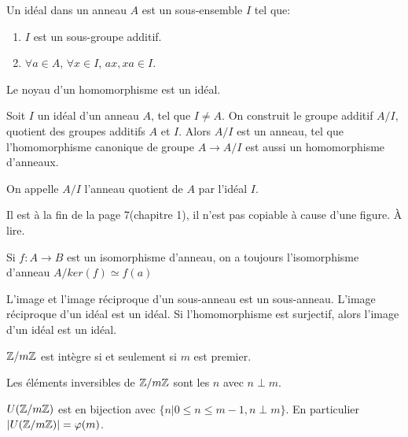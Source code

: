 \documentclass[12pt,a4paper]{article}
\begin{document}
\begin{flushleft}
\begin{mydef}
Un idéal dans un anneau $A$ est un sous-ensemble $I$ tel que:
\begin{enumerate}
\item $I$ est un sous-groupe additif.
\item $\forall a \in A$, $\forall x \in I$, $ax, xa \in I$.
\end{enumerate}
\end{mydef}

\begin{prop}
Le noyau d'un homomorphisme est un idéal.
\end{prop}

\begin{prop}
Soit $I$ un idéal d'un anneau $A$, tel que $I \neq A$. On construit le groupe additif $A/I$, quotient des groupes additifs $A$ et $I$. Alors $A/I$ est un anneau, tel que l'homomorphisme canonique de groupe $A \longrightarrow A/I$ est aussi un homomorphisme d'anneaux.
\end{prop}

\begin{mydef}
On appelle $A/I$ l'anneau quotient de $A$ par l'idéal $I$.
\end{mydef}

\begin{thm}
Il est à la fin de la page 7(chapitre 1), il n'est pas copiable à cause d'une figure. À lire.
\end{thm}

\begin{cor}
Si $f: A\longrightarrow B$ est un isomorphisme d'anneau, on a toujours l'isomorphisme d'anneau $A/ker(f) \simeq f(a)$
\end{cor}

\begin{prop}
L'image et l'image réciproque d'un sous-anneau est un sous-anneau. L'image réciproque d'un idéal est un idéal. Si l'homomorphisme est surjectif, alors l'image d'un idéal est un idéal.
\end{prop}

\begin{prop} 
$\mathbb{Z} / m \mathbb{Z}$ est intègre si et seulement si $m$ est premier.
\end{prop}

\begin{prop}
Les éléments inversibles de $\mathbb{Z} / m \mathbb{Z}$ sont les $n$ avec $ n \perp m$. 
\end{prop}

\begin{cor}
$U(\mathbb{Z} / m \mathbb{Z} )$ est en bijection avec $\{ n | 0 \leqslant n \leqslant m-1, n \perp m  \} $. En particulier $| U(\mathbb{Z} / m \mathbb{Z})| = \varphi (m)$.
\end{cor}


\end{flushleft}
\end{document}
